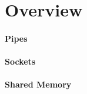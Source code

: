 \section{Overview}\label{sec:overview}




\paragraph{Pipes}

\paragraph{Sockets}

\paragraph{Shared Memory}

